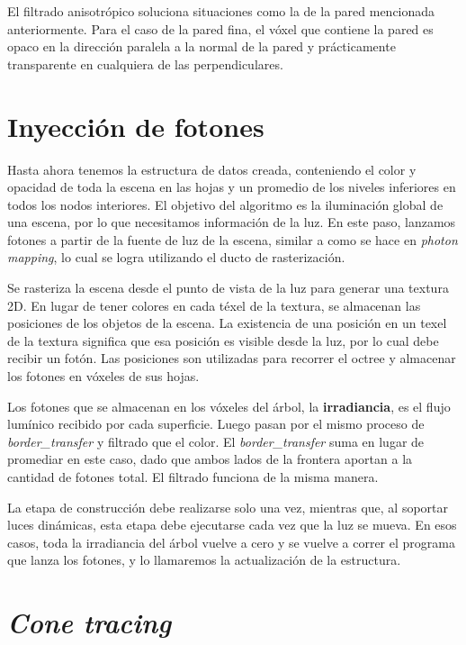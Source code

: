 El filtrado anisotrópico soluciona situaciones como la de la pared mencionada anteriormente.
Para el caso de la pared fina, el vóxel que contiene la pared es opaco en la dirección paralela a la normal de la pared y prácticamente transparente en cualquiera de las perpendiculares.

\section{Inyección de fotones}\label{sec:photon-injection}

Hasta ahora tenemos la estructura de datos creada, conteniendo el color y opacidad de toda la escena en las hojas y un promedio de los niveles inferiores en todos los nodos interiores.
El objetivo del algoritmo es la iluminación global de una escena, por lo que necesitamos información de la luz.
En este paso, lanzamos fotones a partir de la fuente de luz de la escena, similar a como se hace en \textit{photon mapping}, lo cual se logra utilizando el ducto de rasterización.

Se rasteriza la escena desde el punto de vista de la luz para generar una textura 2D.
En lugar de tener colores en cada téxel de la textura, se almacenan las posiciones de los objetos de la escena.
La existencia de una posición en un texel de la textura significa que esa posición es visible desde la luz, por lo cual debe recibir un fotón.
Las posiciones son utilizadas para recorrer el octree y almacenar los fotones en vóxeles de sus hojas.

Los fotones que se almacenan en los vóxeles del árbol, la \textbf{irradiancia}, es el flujo lumínico recibido por cada superficie.
Luego pasan por el mismo proceso de \textit{border\_transfer} y filtrado que el color.
El \textit{border\_transfer} suma en lugar de promediar en este caso, dado que ambos lados de la frontera aportan a la cantidad de fotones total.
El filtrado funciona de la misma manera.

La etapa de construcción debe realizarse solo una vez, mientras que, al soportar luces dinámicas, esta etapa debe ejecutarse cada vez que la luz se mueva.
En esos casos, toda la irradiancia del árbol vuelve a cero y se vuelve a correr el programa que lanza los fotones, y lo llamaremos la actualización de la estructura.


\section{\textit{Cone tracing}}\label{sec:cone_tracing}

